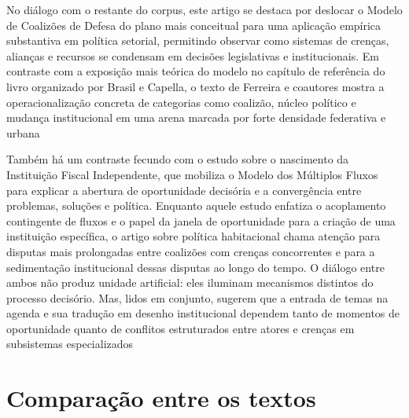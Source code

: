 \documentclass[12pt,a4paper]{article}
\begin{document}
No diálogo com o restante do corpus, este artigo se destaca por deslocar o Modelo de Coalizões de Defesa do plano mais conceitual para uma aplicação empírica substantiva em política setorial, permitindo observar como sistemas de crenças, alianças e recursos se condensam em decisões legislativas e institucionais. Em contraste com a exposição mais teórica do modelo no capítulo de referência do livro organizado por Brasil e Capella, o texto de Ferreira e coautores mostra a operacionalização concreta de categorias como coalizão, núcleo político e mudança institucional em uma arena marcada por forte densidade federativa e urbana\parencite{brasil2022_abordagens_contemporaneas,ferreira2019_politica_habitacional}

Também há um contraste fecundo com o estudo sobre o nascimento da Instituição Fiscal Independente, que mobiliza o Modelo dos Múltiplos Fluxos para explicar a abertura de oportunidade decisória e a convergência entre problemas, soluções e política. Enquanto aquele estudo enfatiza o acoplamento contingente de fluxos e o papel da janela de oportunidade para a criação de uma instituição específica, o artigo sobre política habitacional chama atenção para disputas mais prolongadas entre coalizões com crenças concorrentes e para a sedimentação institucional dessas disputas ao longo do tempo. O diálogo entre ambos não produz unidade artificial: eles iluminam mecanismos distintos do processo decisório. Mas, lidos em conjunto, sugerem que a entrada de temas na agenda e sua tradução em desenho institucional dependem tanto de momentos de oportunidade quanto de conflitos estruturados entre atores e crenças em subsistemas especializados\parencite{anonsd_sem_titulo,ferreira2019_politica_habitacional}



\section{Comparação entre os textos}
\label{sec:org278b039}
\end{document}
